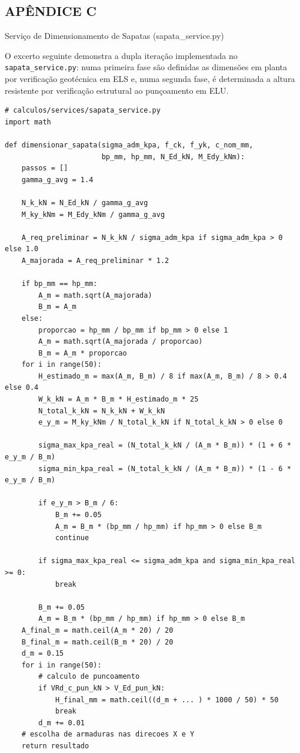 \newpage
{}
\begin{center}
\section*{APÊNDICE C}
Serviço de Dimensionamento de Sapatas (sapata\_service.py)
\end{center}

O excerto seguinte demonstra a dupla iteração implementada no \texttt{sapata\_service.py}: numa primeira fase são definidas as dimensões em planta por verificação geotécnica em ELS e, numa segunda fase, é determinada a altura resistente por verificação estrutural ao punçoamento em ELU.

\newpage
\begin{lstlisting}[style=PythonStyle, basicstyle=\ttfamily\normalsize, caption={Excerto de sapata\_service.py (Dupla iteração)}, label={lst:sapata_service}]
# calculos/services/sapata_service.py
import math

def dimensionar_sapata(sigma_adm_kpa, f_ck, f_yk, c_nom_mm,
                       bp_mm, hp_mm, N_Ed_kN, M_Edy_kNm):
    passos = []
    gamma_g_avg = 1.4

    N_k_kN = N_Ed_kN / gamma_g_avg
    M_ky_kNm = M_Edy_kNm / gamma_g_avg

    A_req_preliminar = N_k_kN / sigma_adm_kpa if sigma_adm_kpa > 0 else 1.0
    A_majorada = A_req_preliminar * 1.2

    if bp_mm == hp_mm:
        A_m = math.sqrt(A_majorada)
        B_m = A_m
    else:
        proporcao = hp_mm / bp_mm if bp_mm > 0 else 1
        A_m = math.sqrt(A_majorada / proporcao)
        B_m = A_m * proporcao
    for i in range(50):
        H_estimado_m = max(A_m, B_m) / 8 if max(A_m, B_m) / 8 > 0.4 else 0.4
        W_k_kN = A_m * B_m * H_estimado_m * 25
        N_total_k_kN = N_k_kN + W_k_kN
        e_y_m = M_ky_kNm / N_total_k_kN if N_total_k_kN > 0 else 0

        sigma_max_kpa_real = (N_total_k_kN / (A_m * B_m)) * (1 + 6 * e_y_m / B_m)
        sigma_min_kpa_real = (N_total_k_kN / (A_m * B_m)) * (1 - 6 * e_y_m / B_m)

        if e_y_m > B_m / 6:
            B_m += 0.05
            A_m = B_m * (bp_mm / hp_mm) if hp_mm > 0 else B_m
            continue

        if sigma_max_kpa_real <= sigma_adm_kpa and sigma_min_kpa_real >= 0:
            break

        B_m += 0.05
        A_m = B_m * (bp_mm / hp_mm) if hp_mm > 0 else B_m
    A_final_m = math.ceil(A_m * 20) / 20
    B_final_m = math.ceil(B_m * 20) / 20
    d_m = 0.15
    for i in range(50):
        # calculo de puncoamento
        if VRd_c_pun_kN > V_Ed_pun_kN:
            H_final_mm = math.ceil((d_m + ... ) * 1000 / 50) * 50
            break
        d_m += 0.01
    # escolha de armaduras nas direcoes X e Y
    return resultado
\end{lstlisting}

